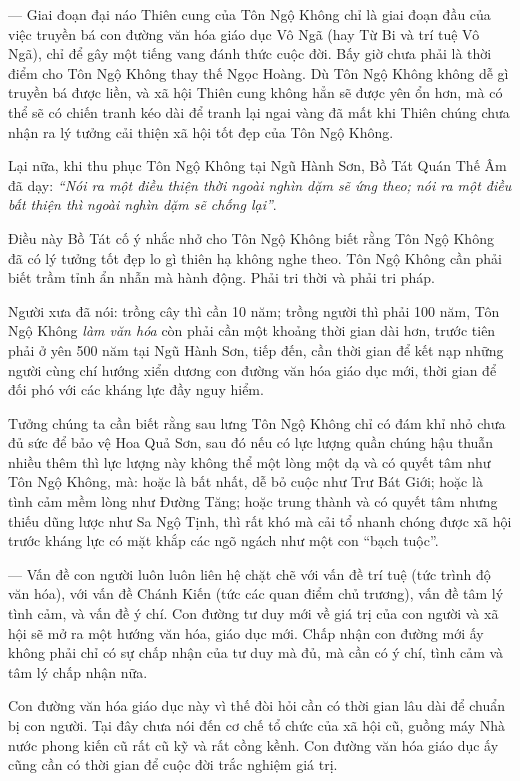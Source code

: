 — Giai đoạn đại náo Thiên cung của Tôn Ngộ Không chỉ là giai đoạn đầu của việc truyền bá con đường văn hóa giáo dục Vô Ngã (hay Từ Bi và trí tuệ Vô Ngã), chỉ để gây một tiếng vang đánh thức cuộc đời. Bấy giờ chưa phải là thời điểm cho Tôn Ngộ Không thay thế Ngọc Hoàng. Dù Tôn Ngộ Không không dễ gì truyền bá được liền, và xã hội Thiên cung không hẳn sẽ được yên ổn hơn, mà có thể sẽ có chiến tranh kéo dài để tranh lại ngai vàng đã mất khi Thiên chúng chưa nhận ra lý tưởng cải thiện xã hội tốt đẹp của Tôn Ngộ Không.

Lại nữa, khi thu phục Tôn Ngộ Không tại Ngũ Hành Sơn, Bồ Tát Quán Thế Âm đã dạy: \emph{``Nói ra một điều thiện thời ngoài nghìn dặm sẽ ứng theo; nói ra một điều bất thiện thì ngoài nghìn dặm sẽ chống lại''}.

Điều này Bồ Tát cố ý nhắc nhở cho Tôn Ngộ Không biết rằng Tôn Ngộ Không đã có lý tưởng tốt đẹp lo gì thiên hạ không nghe theo. Tôn Ngộ Không cần phải biết trầm tỉnh ẩn nhẫn mà hành động. Phải tri thời và phải tri pháp.

Người xưa đã nói: trồng cây thì cần 10 năm; trồng người thì phải 100 năm, Tôn Ngộ Không \emph{làm văn hóa} còn phải cần một khoảng thời gian dài hơn, trước tiên phải ở yên 500 năm tại Ngũ Hành Sơn, tiếp đến, cần thời gian để kết nạp những người cùng chí hướng xiển dương con đường văn hóa giáo dục mới, thời gian để đối phó với các kháng lực đầy nguy hiểm.

Tưởng chúng ta cần biết rằng sau lưng Tôn Ngộ Không chỉ có đám khỉ nhỏ chưa đủ sức để bảo vệ Hoa Quả Sơn, sau đó nếu có lực lượng quần chúng hậu thuẫn nhiều thêm thì lực lượng này không thể một lòng một dạ và có quyết tâm như Tôn Ngộ Không, mà: hoặc là bất nhất, dễ bỏ cuộc như Trư Bát Giới; hoặc là tình cảm mềm lòng như Đường Tăng; hoặc trung thành và có quyết tâm nhưng thiếu dũng lược như Sa Ngộ Tịnh, thì rất khó mà cải tổ nhanh chóng được xã hội trước kháng lực có mặt khắp các ngõ ngách như một con ``bạch tuộc''.

— Vấn đề con người luôn luôn liên hệ chặt chẽ với vấn đề trí tuệ (tức trình độ văn hóa), với vấn đề Chánh Kiến (tức các quan điểm chủ trương), vấn đề tâm lý tình cảm, và vấn đề ý chí. Con đường tư duy mới về giá trị của con người và xã hội sẽ mở ra một hướng văn hóa, giáo dục mới. Chấp nhận con đường mới ấy không phải chỉ có sự chấp nhận của tư duy mà đủ, mà cần có ý chí, tình cảm và tâm lý chấp nhận nữa.

Con đường văn hóa giáo dục này vì thế đòi hỏi cần có thời gian lâu dài để chuẩn bị con người. Tại đây chưa nói đến cơ chế tổ chức của xã hội cũ, guồng máy Nhà nước phong kiến cũ rất cũ kỹ và rất cồng kềnh. Con đường văn hóa giáo dục ấy cũng cần có thời gian để cuộc đời trắc nghiệm giá trị.

